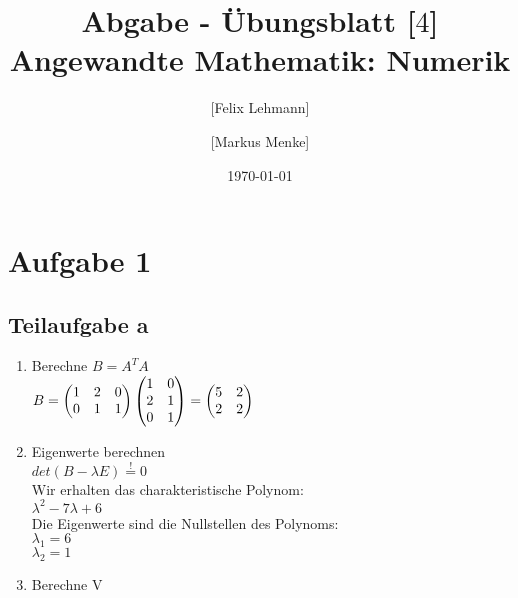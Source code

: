 \documentclass[10pt,a4paper]{article}
\begin{document}
\title{Abgabe - Übungsblatt [$4$]\\
\small{Angewandte Mathematik: Numerik}}
\author{ [Felix Lehmann] \and [Markus Menke]}
\date{\today}
\maketitle

\section*{Aufgabe 1}
\subsection{Teilaufgabe a}
\begin{enumerate}
    \item Berechne  $B = A^TA$\\
    
    $B = \begin{pmatrix}
        1 & 2 & 0\\
        0 & 1 & 1
    \end{pmatrix}
    \begin{pmatrix}
        1 & 0\\
        2 & 1\\
        0 & 1
    \end{pmatrix} =
    \begin{pmatrix}
        5 & 2\\
        2 & 2
    \end{pmatrix}\\
    $
    \item Eigenwerte berechnen\\
    
    $det( B - \lambda E) \overset{!}{=} 0$\\
    Wir erhalten das charakteristische Polynom: \\
    $\lambda^2 - 7\lambda +6$\\
    Die Eigenwerte sind die Nullstellen des Polynoms:\\
    $\lambda_1 = 6$\\
    $\lambda_2 = 1$\\

    \item Berechne V\\
    

\end{enumerate}
\end{document}
